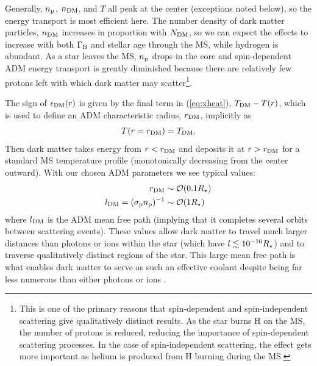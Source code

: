 \documentclass[useAMS,usenatbib]{mnras}
\begin{document}
  Generally, $n_{\mathrm{p}}$, $n_{\mathrm{DM}}$, and $T$ all peak at the center (exceptions noted below), so the energy transport is most efficient here. The number density 
  of dark matter particles, $n_{\mathrm{DM}}$ increases in proportion with $N_{\mathrm{DM}}$, so we can expect the effects to increase with both $\Gamma_\mathrm{B}$ and stellar age through the MS, while hydrogen is abundant. As a star leaves the MS, $n_{\mathrm{p}}$ drops in the core and spin-dependent ADM energy transport is greatly diminished because there are relatively few protons left with which dark matter may scatter\footnote{This is one of the primary reasons that spin-dependent and spin-independent scattering give qualitatively distinct results. As the star burns H on the MS, the number of protons is reduced, reducing the importance of spin-dependent scattering processes. In the case of spin-independent scattering, the effect gets more important as helium 
  is produced from H burning during the MS.}. 

  The sign of $\epsilon_{\mathrm{DM}}(r)$ is given by the final term in (\ref{eq:xheat}), $T_{\mathrm{DM}} - T(r)$, which is used to define an ADM characteristic radius, $r_{\mathrm{DM}}$, implicitly as
  \begin{align}
    T(r=r_{\mathrm{DM}}) = T_{\mathrm{DM}}.
  \end{align}
  Then dark matter takes energy from $r < r_{\mathrm{DM}}$ and deposits it at $r > r_{\mathrm{DM}}$ for a standard MS temperature profile (monotonically decreasing from the center outward). With our chosen ADM parameters we see typical values:
  \begin{align}
    r_{\mathrm{DM}} & \sim \mathcal{O}(0.1 R_{\star}) \\
    l_{\mathrm{DM}} = (\sigma_{\mathrm{p}} n_{\mathrm{p}})^{-1} & \sim\mathcal{O}(1 R_{\star})
  \end{align}
  where $l_{\mathrm{DM}}$ is the ADM mean free path (implying that it completes several orbits between scattering events). These values allow dark matter to travel much larger distances than photons or ions within the star (which have $l \lesssim 10^{-10} R_{\star}$) and to traverse qualitatively distinct 
  regions of the star. This large mean free path is what enables dark matter 
  to serve as such an effective coolant despite being far less numerous than either photons or ions \citep{Spergel1985EffectInterior}.

\end{document}
